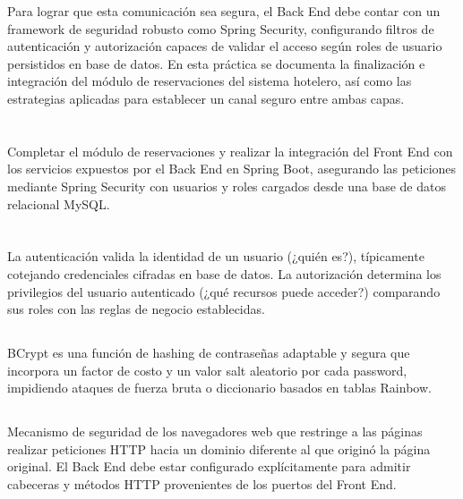 \documentclass[10pt,a4paper]{article}
\begin{document}
Para lograr que esta comunicación sea segura, el Back End debe contar con un framework de seguridad robusto como Spring Security, configurando filtros de autenticación y autorización capaces de validar el acceso según roles de usuario persistidos en base de datos. En esta práctica se documenta la finalización e integración del módulo de reservaciones del sistema hotelero, así como las estrategias aplicadas para establecer un canal seguro entre ambas capas.

\pagebreak

\section{\color{colorIPN}{Objetivo de la práctica}}

Completar el módulo de reservaciones y realizar la integración del Front End con los servicios expuestos por el Back End en Spring Boot, asegurando las peticiones mediante Spring Security con usuarios y roles cargados desde una base de datos relacional MySQL.

\pagebreak

\section{\color{colorIPN}{Conceptos}}

\subsection{\textit{\color{colorESCOM}{Autenticación y Autorización}}}
La autenticación valida la identidad de un usuario (¿quién es?), típicamente cotejando credenciales cifradas en base de datos. La autorización determina los privilegios del usuario autenticado (¿qué recursos puede acceder?) comparando sus roles con las reglas de negocio establecidas.

\subsection{\textit{\color{colorESCOM}{BCrypt y Hashing de Contraseñas}}}
BCrypt es una función de hashing de contraseñas adaptable y segura que incorpora un factor de costo y un valor salt aleatorio por cada password, impidiendo ataques de fuerza bruta o diccionario basados en tablas Rainbow.

\subsection{\textit{\color{colorESCOM}{Políticas CORS (Cross-Origin Resource Sharing)}}}
Mecanismo de seguridad de los navegadores web que restringe a las páginas realizar peticiones HTTP hacia un dominio diferente al que originó la página original. El Back End debe estar configurado explícitamente para admitir cabeceras y métodos HTTP provenientes de los puertos del Front End.
\end{document}
